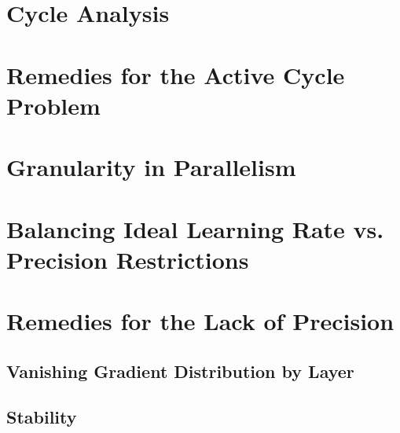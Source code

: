 \section{Cycle Analysis}
\section{Remedies for the Active Cycle Problem}
\section{Granularity in Parallelism}
\section{Balancing Ideal Learning Rate vs. Precision Restrictions}
\section{Remedies for the Lack of Precision}
\subsection{Vanishing Gradient Distribution by Layer}
\subsection{Stability}




